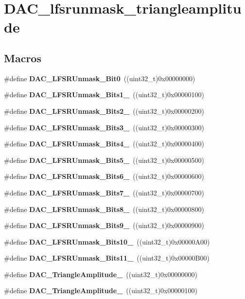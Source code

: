 \section{D\+A\+C\+\_\+lfsrunmask\+\_\+triangleamplitude}
\label{group__DAC__lfsrunmask__triangleamplitude}
\subsection*{Macros}
\begin{DoxyCompactItemize}
\item 
\#define \textbf{ D\+A\+C\+\_\+\+L\+F\+S\+R\+Unmask\+\_\+\+Bit0}~((uint32\+\_\+t)0x00000000)
\item 
\#define \textbf{ D\+A\+C\+\_\+\+L\+F\+S\+R\+Unmask\+\_\+\+Bits1\+\_}~((uint32\+\_\+t)0x00000100)
\item 
\#define \textbf{ D\+A\+C\+\_\+\+L\+F\+S\+R\+Unmask\+\_\+\+Bits2\+\_}~((uint32\+\_\+t)0x00000200)
\item 
\#define \textbf{ D\+A\+C\+\_\+\+L\+F\+S\+R\+Unmask\+\_\+\+Bits3\+\_}~((uint32\+\_\+t)0x00000300)
\item 
\#define \textbf{ D\+A\+C\+\_\+\+L\+F\+S\+R\+Unmask\+\_\+\+Bits4\+\_}~((uint32\+\_\+t)0x00000400)
\item 
\#define \textbf{ D\+A\+C\+\_\+\+L\+F\+S\+R\+Unmask\+\_\+\+Bits5\+\_}~((uint32\+\_\+t)0x00000500)
\item 
\#define \textbf{ D\+A\+C\+\_\+\+L\+F\+S\+R\+Unmask\+\_\+\+Bits6\+\_}~((uint32\+\_\+t)0x00000600)
\item 
\#define \textbf{ D\+A\+C\+\_\+\+L\+F\+S\+R\+Unmask\+\_\+\+Bits7\+\_}~((uint32\+\_\+t)0x00000700)
\item 
\#define \textbf{ D\+A\+C\+\_\+\+L\+F\+S\+R\+Unmask\+\_\+\+Bits8\+\_}~((uint32\+\_\+t)0x00000800)
\item 
\#define \textbf{ D\+A\+C\+\_\+\+L\+F\+S\+R\+Unmask\+\_\+\+Bits9\+\_}~((uint32\+\_\+t)0x00000900)
\item 
\#define \textbf{ D\+A\+C\+\_\+\+L\+F\+S\+R\+Unmask\+\_\+\+Bits10\+\_}~((uint32\+\_\+t)0x00000\+A00)
\item 
\#define \textbf{ D\+A\+C\+\_\+\+L\+F\+S\+R\+Unmask\+\_\+\+Bits11\+\_}~((uint32\+\_\+t)0x00000\+B00)
\item 
\#define \textbf{ D\+A\+C\+\_\+\+Triangle\+Amplitude\+\_}~((uint32\+\_\+t)0x00000000)
\item 
\#define \textbf{ D\+A\+C\+\_\+\+Triangle\+Amplitude\+\_}~((uint32\+\_\+t)0x00000100)

\end{DoxyCompactItemize}
